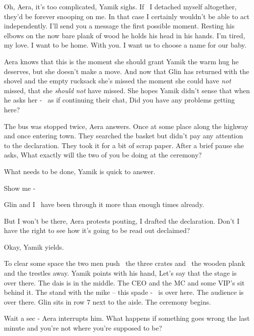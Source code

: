 \documentclass[12pt]{book}
\begin{document}
{\textquotedbl}Oh, Aera, it's too complicated,{\textquotedbl} Yamik sighs. {\textquotedbl}If \ I detached myself
altogether, they'd be forever snooping on{ }me. In that case I certainly wouldn't be able to act
independently. I'll send you a message the first possible moment.{\textquotedbl} Resting his elbows on the now bare
plank of wood he holds his head in his hands. {\textquotedbl}I'm tired, my love. I want to be home. With you. I want
us{ }to choose a name for our baby.{\textquotedbl}

Aera knows that this is the moment she should grant Yamik the warm hug he deserves, but she doesn't make a move. And now
that Glin has returned with the shovel and the empty rucksack she's missed the moment she could have \textit{not}
missed, that she \textit{should} \textit{not} have missed. She hopes Yamik didn't sense that when he asks her - \ as if
continuing their chat, {\textquotedbl}Did you have any problems getting here?{\textquotedbl}

{\textquotedbl}The bus was stopped twice,{\textquotedbl} Aera answers. {\textquotedbl}Once at some place along the
highway and once entering town. They searched the basket but didn't pay any attention to the declaration. They took it
for a bit of scrap paper.{\textquotedbl} After a brief pause she asks, {\textquotedbl}What exactly will the two of you
be doing at the ceremony?{\textquotedbl}

{\textquotedbl}What needs to be done,{\textquotedbl} Yamik is quick to answer.

{\textquotedbl}Show me -{\textquotedbl}

{\textquotedbl}Glin and I~ have been through it more than enough times already.{\textquotedbl}

{\textquotedbl}But I won't be there,{\textquotedbl} Aera protests pouting, {\textquotedbl}I drafted the declaration.
Don't I have the right to see how it's going to be read out declaimed?{\textquotedbl}

{\textquotedbl}Okay,{\textquotedbl} Yamik yields.

To clear some space the two men push \ the three crates and \ the wooden plank and the trestles
away{.} Yamik points with his hand, {\textquotedbl}Let's say that the stage is
over there. The dais is in the middle. The CEO and the MC and some VIP's sit behind it. The stand with the mike -- this
spade - ~is over here. The audience is over there. Glin sits in row 7 next to the aisle. The ceremony
begins.{\textquotedbl}

{\textquotedbl}Wait a sec - {\textquotedbl} Aera interrupts him. {\textquotedbl}What happens if something goes wrong the
last minute and you're not where you're supposed to be?{\textquotedbl}
\end{document}
